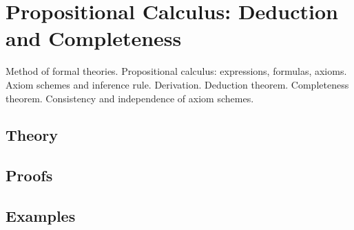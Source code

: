 
\section{Propositional Calculus: Deduction and Completeness}
\label{sec:2.3a.03-propositional-calculus}

\begin{ticket}
Method of formal theories. Propositional calculus: expressions, formulas, axioms. Axiom schemes and inference rule. Derivation. Deduction theorem. Completeness theorem. Consistency and independence of axiom schemes.
\end{ticket}

\subsection*{Theory}

\subsection*{Proofs}

\subsection*{Examples}
